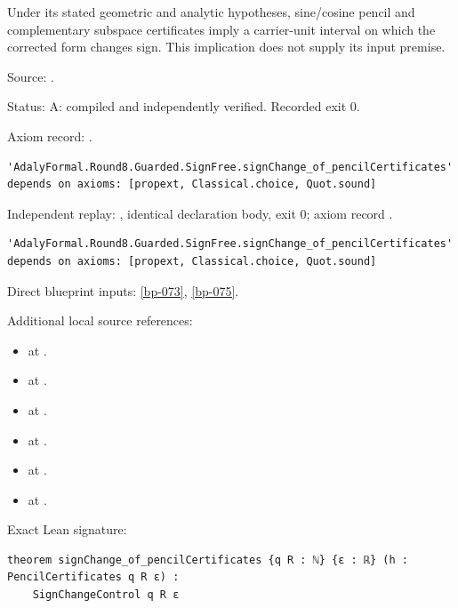 \begin{theorem}[bp-259]
\label{bp-259}
\leanok
Under its stated geometric and analytic hypotheses, sine/cosine pencil and complementary subspace certificates imply a carrier-unit interval on which the corrected form changes sign. This implication does not supply its input premise.

\par Source: \texttt{}.
\par Status: A: compiled and independently verified. Recorded exit 0.
\par Axiom record: \texttt{}.
\begin{verbatim}
'AdalyFormal.Round8.Guarded.SignFree.signChange_of_pencilCertificates' depends on axioms: [propext, Classical.choice, Quot.sound]
\end{verbatim}
\par Independent replay: \texttt{}, identical declaration body, exit 0; axiom record \texttt{}.
\begin{verbatim}
'AdalyFormal.Round8.Guarded.SignFree.signChange_of_pencilCertificates' depends on axioms: [propext, Classical.choice, Quot.sound]
\end{verbatim}
\par Direct blueprint inputs: \ref{bp-073}, \ref{bp-075}.
\par Additional local source references:
\begin{itemize}
\item \texttt{} at \texttt{}.
\item \texttt{} at \texttt{}.
\item \texttt{} at \texttt{}.
\item \texttt{} at \texttt{}.
\item \texttt{} at \texttt{}.
\item \texttt{} at \texttt{}.
\end{itemize}
\par Exact Lean signature:
\begin{verbatim}
theorem signChange_of_pencilCertificates {q R : ℕ} {ε : ℝ} (h : PencilCertificates q R ε) :
    SignChangeControl q R ε
\end{verbatim}
\end{theorem}

